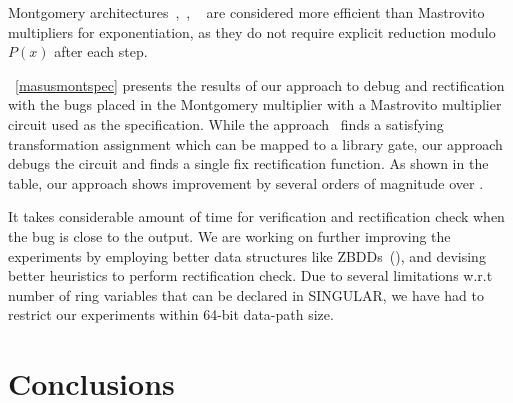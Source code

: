 Montgomery architectures~\cite{acar:1998},~\cite{wu:2002},
~\cite{knezevic:2008} are considered more efficient than Mastrovito multipliers for exponentiation, 
as they do not require explicit reduction modulo $P(x)$ after each step.

~\autoref{masusmontspec} presents the results of our approach to debug
and rectification with the bugs placed in the Montgomery multiplier
with a Mastrovito multiplier circuit used as the specification. While
the approach~\cite{fujita:2015} finds a satisfying transformation
assignment which can be mapped to a library gate, our approach debugs
the circuit and finds a single fix rectification function. As shown in
the table, our approach shows improvement by several orders of
magnitude over \cite{fujita:2015}. 

It takes considerable amount of time for verification and
rectification check when the bug is close to the output. We are
working on further improving the experiments by employing better data
structures like  
ZBDDs~(\cite{minato:zbdd}), and devising better heuristics to perform
rectification check.
Due to several limitations w.r.t number of ring variables that can be
declared in SINGULAR, we have had to restrict our experiments within
64-bit data-path size.   

\section{Conclusions}


